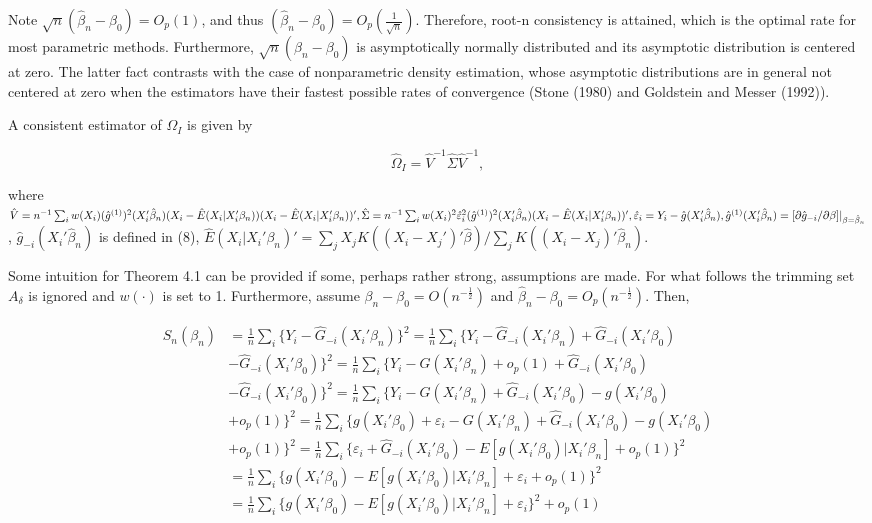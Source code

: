 \documentclass[a4paper]{article}
\begin{document}
Note $\sqrt{n}(\hat{\beta}_n - \beta_0)=O_p(1)$, and thus $(\hat{\beta}_n - \beta_0) = O_p\left(\frac{1}{\sqrt{n}}\right)$. Therefore, root-n consistency is attained, which is the optimal rate for most parametric methods. Furthermore, $\sqrt{n}(\hat{\beta}_n - \beta_0)$ is asymptotically normally distributed and its asymptotic distribution is centered at zero. The latter fact contrasts with the case of nonparametric density estimation, whose asymptotic distributions are in general not centered at zero when the estimators have their fastest possible rates of convergence (Stone (1980) and Goldstein and Messer (1992)). 


A consistent estimator of $\Omega_I$ is given by

\[ \hat{\Omega}_I = \hat{V}^{-1}\hat{\Sigma}\hat{V}^{-1}, \]

where $\hat{V} = n^{-1}\sum_{i} w(X_i)(\hat{g}^{(1)})^2(X_i'\hat{\beta}_n)(X_i - \hat{E}(X_i|X_i'\beta_n))(X_i - \hat{E}(X_i|X_i'\beta_n))', \hat{\Sigma} = n^{-1}\sum_{i} w(X_i)^2\hat{\varepsilon}_{i}^{2}(\hat{g}^{(1)})^2(X_i'\hat{\beta}_n)(X_i - \hat{E}(X_i|X_i'\beta_n))', \hat{\varepsilon}_i = Y_i - \hat{g}(X_i'\hat{\beta}_n), \hat{g}^{(1)}(X_i'\hat{\beta}_n) \linebreak
= [\partial \hat{g}_{-i}/\partial \beta]|_{\beta=\hat{\beta}_n}$, $\hat{g}_{-i}(X_i'\hat{\beta}_n)$ is defined in (8), $\hat{E}(X_i|X_i'\beta_n)' = \sum_{j} X_jK((X_i - X_j')'\hat{\beta})/ \sum_{j}K((X_i - X_j)'\hat{\beta}_n).$

Some intuition for Theorem 4.1 can be provided if some, perhaps rather strong, assumptions are made. For what follows the trimming set $A_\delta$ is ignored and $w(\cdot)$ is set to 1. Furthermore, assume $\beta_n - \beta_0 = O(n^{-\frac{1}{2}})$ and $\hat{\beta}_n - \beta_0 = O_p(n^{-\frac{1}{2}})$. Then, 


\begin{align*}
S_{n}(\beta_n) & = \frac{1}{n}\sum_i \{ Y_i - \hat{G}_{-i}(X_i'\beta_n)\}^2 = \frac{1}{n}\sum_i\{Y_i - \hat{G}_{-i}(X_i'\beta_n) +  \hat{G}_{-i}(X_i'\beta_0) \\
			   & - \hat{G}_{-i}(X_i'\beta_0) \}^2 = \frac{1}{n} \sum_i \{Y_i - G(X_i'\beta_n) + o_p(1) + \hat{G}_{-i}(X_i'\beta_0) \\
			   & - \hat{G}_{-i}(X_i'\beta_0) \}^2 = \frac{1}{n}\sum_i \{ Y_i - G(X_i'\beta_n) + \hat{G}_{-i}(X_i'\beta_0) - g(X_i'\beta_0) \\
			   &  + o_p(1) \}^2 = \frac{1}{n} \sum_i \{ g(X_i'\beta_0) + \varepsilon_i - G(X_i'\beta_n) + \hat{G}_{-i}(X_i'\beta_0) - g(X_i'\beta_0)\\
			   & + o_p(1) \}^2 = \frac{1}{n} \sum_i \{ \varepsilon_i + \hat{G}_{-i}(X_i'\beta_0) - E[g(X_i'\beta_0)|X_i'\beta_n]  + o_p(1) \}^2 \\
			   &= \frac{1}{n}\sum_i \{ g(X_i'\beta_0) - E[g(X_i'\beta_0)|X_i'\beta_n] +  \varepsilon_i + o_p(1)\}^2 \\
			 & = \frac{1}{n}\sum_i \{ g(X_i'\beta_0) - E[g(X_i'\beta_0)|X_i'\beta_n] +  \varepsilon_i\}^2 + o_p(1)
\end{align*}
\end{document}
